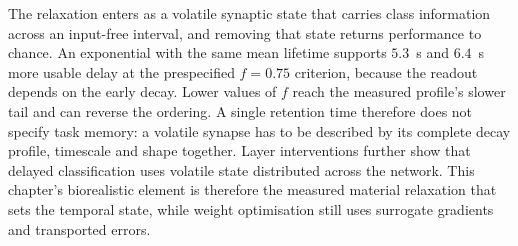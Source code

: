 \noindent The  relaxation enters as a volatile synaptic state that carries class information across an
input-free interval, and removing that state returns performance to chance. An exponential with the same mean lifetime
supports $5.3$~s and $6.4$~s more usable delay at the prespecified $f=0.75$ criterion, because the readout depends on
the early decay. Lower values of $f$ reach the measured profile's slower tail and can reverse the ordering. A single
retention time therefore does not specify task memory: a volatile synapse has to be described by its complete decay
profile, timescale and shape together.
Layer interventions further show that delayed classification uses volatile state distributed across the network.
This chapter's biorealistic element is therefore the measured material relaxation that sets the temporal state, while
weight optimisation still uses surrogate gradients and transported errors.
